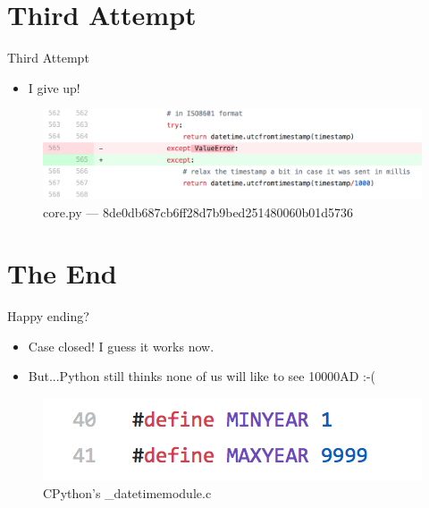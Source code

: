 \documentclass[10pt]{beamer}
\begin{document}
\section{Third Attempt}
\begin{frame}{Third Attempt}
	\begin{itemize}
		\item I give up!
	\end{itemize}
	\begin{figure}
		\centering
		\includegraphics[width=\textwidth]{images/commit3.png}
		\caption{core.py --- 8de0db687cb6ff28d7b9bed251480060b01d5736}
	\end{figure}
\end{frame}

\section{The End}
\begin{frame}{Happy ending?}
	\begin{itemize}
		\item Case closed! I guess it works now.
		\item But...Python still thinks none of us will like to see 10000AD :-(
	\end{itemize}
	\begin{figure}
		\includegraphics[width=\textwidth]{images/eol.png}
		\caption{CPython's \_datetimemodule.c}
	\end{figure}
\end{frame}
\end{document}
